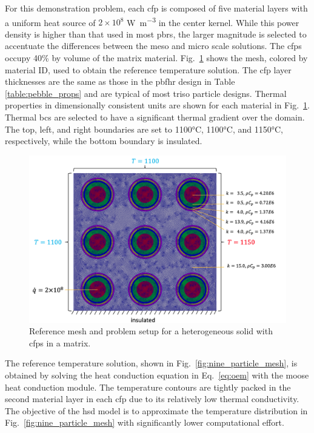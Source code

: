 For this demonstration problem, each \gls{cfp} is composed of five material layers with a uniform heat source of \(2\times10^8\) \si{\watt\per\cubic\meter} in the center kernel. While this power density is higher than that used in most \glspl{pbr}, the larger magnitude is selected to accentuate the differences between the meso and micro scale solutions. The \glspl{cfp} occupy 40\% by volume of the matrix material. Fig.\ \ref{fig:nine_particle_mesha} shows the mesh, colored by material ID, used to obtain the reference temperature solution. The \gls{cfp} layer thicknesses are the same as those in the \gls{pbfhr} design in Table \ref{table:pebble_props} and are typical of most \gls{triso} particle designs. Thermal properties in dimensionally consistent units are shown for each material in Fig.\ \ref{fig:nine_particle_mesha}. Thermal \glspl{bc} are selected to have a significant thermal gradient over the domain. The top, left, and right boundaries are set to 1100\si{\celsius}, 1100\si{\celsius}, and 1150\si{\celsius}, respectively, while the bottom boundary is insulated.

\begin{figure}[!h]
\centering
\hspace{1cm}
  \includegraphics[width=0.75\linewidth]{figs/multiscale_9_problem.png}
\caption{Reference mesh and problem setup for a heterogeneous solid with \glspl{cfp} in a matrix.}
\label{fig:nine_particle_mesha}
\end{figure}

The reference temperature solution, shown in Fig.\ \ref{fig:nine_particle_mesh}, is obtained by solving the heat conduction equation in Eq.\ \eqref{eq:oem} with the \gls{moose} heat conduction module. The temperature contours are tightly packed in the second material layer in each \gls{cfp} due to its relatively low thermal conductivity. The objective of the \gls{hsd} model is to approximate the temperature distribution in Fig.\ \ref{fig:nine_particle_mesh} with significantly lower computational effort.

